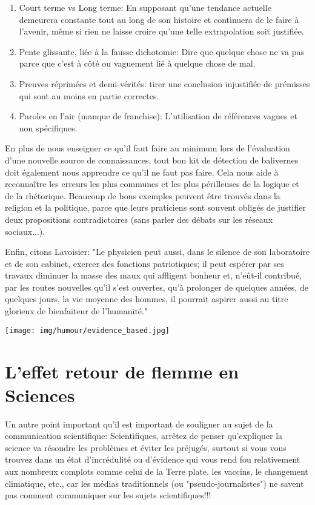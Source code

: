 \begin{enumerate}
		\item Court terme vs Long terme: En supposant qu'une tendance actuelle demeurera constante tout au long de son histoire et continuera de le faire à l'avenir, même si rien ne laisse croire qu'une telle extrapolation soit justifiée.

		\item Pente glissante, liée à la fausse dichotomie: Dire que quelque chose ne va pas parce que c'est à côté ou vaguement lié à quelque chose de mal.

		\item Preuves réprimées et demi-vérités: tirer une conclusion injustifiée de prémisses qui sont au moins en partie correctes.

		\item Paroles en l'air (manque de franchise): L'utilisation de références vagues et non spécifiques.
	\end{enumerate}
	
	En plus de nous enseigner ce qu'il faut faire au minimum lors de l'évaluation d'une nouvelle source de connaissances, tout bon kit de détection de balivernes doit également nous apprendre ce qu'il ne faut pas faire. Cela nous aide à reconnaître les erreurs les plus communes et les plus périlleuses de la logique et de la rhétorique. Beaucoup de bons exemples peuvent être trouvés dans la religion et la politique, parce que leurs praticiens sont souvent obligés de justifier deux propositions contradictoires (sans parler des débats sur les réseaux sociaux...).

	Enfin, citons Lavoisier: "Le physicien peut aussi, dans le silence de son laboratoire et de son cabinet, exercer des fonctions patriotiques; il peut espérer par ses travaux diminuer la masse des maux qui affligent bonheur et, n'eût-il contribué, par les routes nouvelles qu'il s'est ouvertes, qu'à prolonger de quelques années, de quelques jours, la vie moyenne des hommes, il pourrait aspirer aussi au titre glorieux de bienfaiteur de l'humanité."
	\begin{center}
		\texttt{[image: img/humour/evidence\_based.jpg]}	
	\end{center}
	
	\pagebreak
	\section{L'effet retour de flemme en Sciences}
	Un autre point important qu'il est important de souligner au sujet de la communication scientifique: Scientifiques, arrêtez de penser qu'expliquer la science va résoudre les problèmes et éviter les préjugés, surtout si vous vous trouvez dans un état d'incrédulité ou d'évidence qui vous rend fou relativement aux nombreux complots comme celui de la Terre plate. les vaccins, le changement climatique, etc., car les médias traditionnels (ou "pseudo-journalistes") ne savent pas comment communiquer sur les sujets scientifiques!!!


